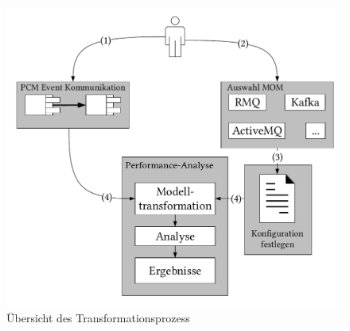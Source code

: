 \begin{figure}
\center
  \includegraphics[width=1\textwidth]{images/transformation/transformationOverview.pdf}
  \caption{Übersicht des Transformationsprozess}
  \label{img:transformationOverview}
\end{figure}


